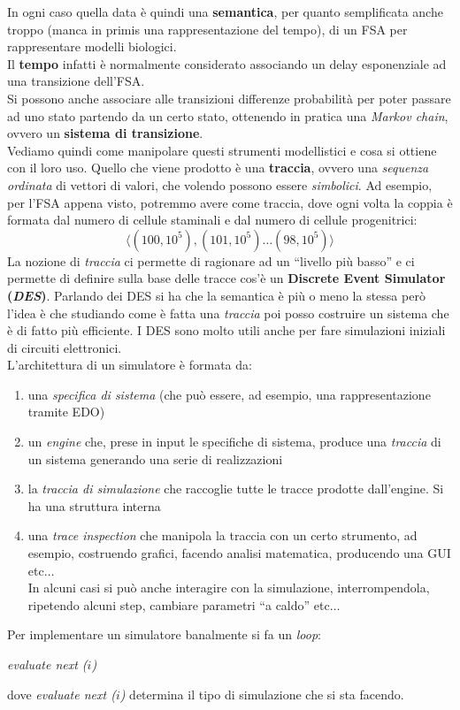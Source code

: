 \documentclass[a4paper,12pt, oneside]{book}
\begin{document}
In ogni caso quella data è quindi una \textbf{semantica}, per quanto
semplificata anche troppo (manca in primis una rappresentazione del tempo), di
un FSA per rappresentare modelli biologici. \\
Il \textbf{tempo} infatti è normalmente considerato associando un delay
esponenziale ad una transizione dell'FSA.\\
Si possono anche associare alle transizioni differenze probabilità per poter
passare ad uno stato partendo da un certo stato, ottenendo in pratica una
\textit{Markov chain}, ovvero un \textbf{sistema di transizione}. \\
Vediamo quindi come manipolare questi strumenti modellistici e cosa si ottiene
con il loro uso. Quello che viene prodotto è una \textbf{traccia}, ovvero una
\textit{sequenza ordinata} di vettori di valori, che volendo possono essere
\textit{simbolici}. Ad esempio, per l'FSA appena visto, potremmo avere come
traccia, dove ogni volta la coppia è formata dal numero di cellule staminali e
dal numero di cellule progenitrici: 
\[\langle{(100, 10^5),(101, 10^5)\ldots(98, 10^5)\rangle}\]
La nozione di \textit{traccia} ci permette di ragionare ad un ``livello più
basso'' e ci permette di definire sulla base delle tracce cos'è un
\textbf{Discrete Event Simulator (\textit{DES})}. Parlando dei DES si ha che la
semantica è più o meno la stessa però l'idea è che studiando come è fatta una
\textit{traccia} poi posso costruire un sistema che è di fatto più efficiente. I
DES sono molto utili anche per fare simulazioni iniziali di circuiti
elettronici. \\
L'architettura di un simulatore è formata da:
\begin{enumerate}
  \item una \textit{specifica di sistema} (che può essere, ad esempio, una
  rappresentazione tramite EDO)
  \item un \textit{engine} che, prese in input le specifiche di sistema, produce
  una \textit{traccia }di un sistema generando una serie di realizzazioni
  \item la \textit{traccia di simulazione} che raccoglie tutte le tracce
  prodotte dall'engine. Si ha una struttura interna
  \item una \textit{trace inspection} che manipola la traccia con un certo
  strumento, ad esempio, costruendo grafici, facendo analisi matematica,
  producendo una GUI etc$\ldots$ \\
  In alcuni casi si può anche interagire con la
  simulazione, interrompendola, ripetendo alcuni step, cambiare parametri ``a
  caldo'' etc$\ldots$ 
\end{enumerate}
Per implementare un simulatore banalmente si fa un \textit{loop}:
\begin{algorithm}[H]
  \begin{algorithmic}
    \State \textit{evaluate next ($i$)}
    \EndFor
  \end{algorithmic}
\end{algorithm}
dove \textit{evaluate next ($i$)} determina il tipo di simulazione che si sta
facendo.\\
\end{document}
